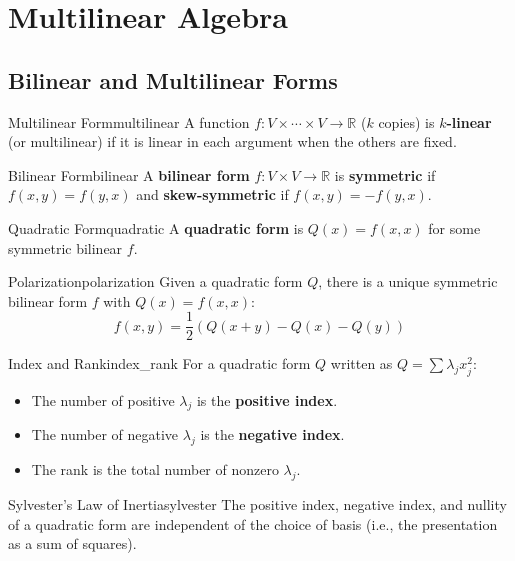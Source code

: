 \documentclass[11pt, letterpaper, openany]{book}
\begin{document}
\chapter{Multilinear Algebra}

\section{Bilinear and Multilinear Forms}

\begin{defn}{Multilinear Form}{multilinear}
A function $f: V \times \cdots \times V \to \mathbb{R}$ ($k$ copies) is \textbf{$k$-linear} (or multilinear) if it is linear in each argument when the others are fixed.
\end{defn}

\begin{defn}{Bilinear Form}{bilinear}
A \textbf{bilinear form} $f: V \times V \to \mathbb{R}$ is \textbf{symmetric} if $f(x,y) = f(y,x)$ and \textbf{skew-symmetric} if $f(x,y) = -f(y,x)$.
\end{defn}

\begin{defn}{Quadratic Form}{quadratic}
A \textbf{quadratic form} is $Q(x) = f(x,x)$ for some symmetric bilinear $f$.
\end{defn}

\begin{thm}{Polarization}{polarization}
Given a quadratic form $Q$, there is a unique symmetric bilinear form $f$ with $Q(x) = f(x,x)$:
\[
f(x,y) = \frac{1}{2}(Q(x+y) - Q(x) - Q(y))
\]
\end{thm}

\begin{defn}{Index and Rank}{index_rank}
For a quadratic form $Q$ written as $Q = \sum \lambda_j x_j^2$:
\begin{itemize}
    \item The number of positive $\lambda_j$ is the \textbf{positive index}.
    \item The number of negative $\lambda_j$ is the \textbf{negative index}.
    \item The rank is the total number of nonzero $\lambda_j$.
\end{itemize}
\end{defn}

\begin{thm}{Sylvester's Law of Inertia}{sylvester}
The positive index, negative index, and nullity of a quadratic form are independent of the choice of basis (i.e., the presentation as a sum of squares).
\end{thm}
\end{document}
